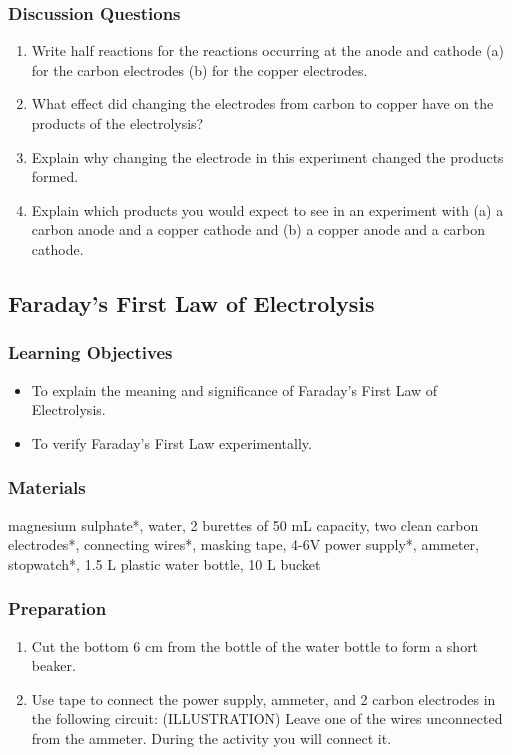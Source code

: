 \subsubsection*{Discussion Questions}
\begin{enumerate}
\item{Write half reactions for the reactions occurring at the anode and cathode (a) for the carbon electrodes (b) for the copper electrodes.}
\item{What effect did changing the electrodes from carbon to copper have on the products of the electrolysis?}
\item{Explain why changing the electrode in this experiment changed the products formed.}
\item{Explain which products you would expect to see in an experiment with (a) a carbon anode and a copper cathode and (b) a copper anode and a carbon cathode.}
\end{enumerate}

\subsection{Faraday's First Law of Electrolysis}

\subsubsection*{Learning Objectives}
\begin{itemize}
\item{To explain the meaning and significance of Faraday's First Law of Electrolysis.}
\item{To verify Faraday's First Law experimentally.}
\end{itemize}

\subsubsection*{Materials}
magnesium sulphate*, water, 2 burettes of 50 mL capacity, two clean carbon electrodes*, connecting wires*, masking tape, 4-6V power supply*, ammeter, stopwatch*, 1.5 L plastic water bottle, 10 L bucket

\subsubsection*{Preparation}
\begin{enumerate}
\item{Cut the bottom 6 cm from the bottle of the water bottle to form a short beaker.}
\item{Use tape to connect the power supply, ammeter, and 2 carbon electrodes in the following circuit: (ILLUSTRATION)
Leave one of the wires unconnected from the ammeter. During the activity you will connect it.}
\end{enumerate}


